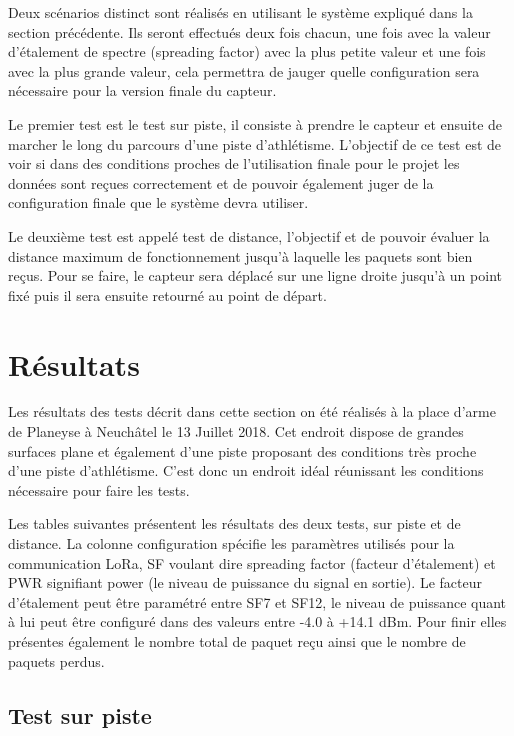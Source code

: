 Deux scénarios distinct sont réalisés en utilisant le système expliqué dans la section précédente. Ils seront effectués deux fois chacun, une fois avec la valeur d'étalement de spectre (spreading factor) avec la plus petite valeur et une fois avec la plus grande valeur, cela permettra de jauger quelle configuration sera nécessaire pour la version finale du capteur.

Le premier test est le test sur piste, il consiste à prendre le capteur et ensuite de marcher le long du parcours d'une piste d'athlétisme. L'objectif de ce test est de voir si dans des conditions proches de l'utilisation finale pour le projet les données sont reçues correctement et de pouvoir également juger de la configuration finale que le système devra utiliser.

Le deuxième test est appelé test de distance, l'objectif et de pouvoir évaluer la distance maximum de fonctionnement jusqu'à laquelle les paquets sont bien reçus. Pour se faire, le capteur sera déplacé sur une ligne droite jusqu'à un point fixé puis il sera ensuite retourné au point de départ.

\section{Résultats}

Les résultats des tests décrit dans cette section on été réalisés à la place d'arme de Planeyse à Neuchâtel le 13 Juillet 2018. Cet endroit dispose de grandes surfaces plane et également d'une piste proposant des conditions très proche d'une piste d'athlétisme. C'est donc un endroit idéal réunissant les conditions nécessaire pour faire les tests.

Les  tables suivantes présentent les résultats des deux tests, sur piste et de distance. La colonne configuration spécifie les paramètres utilisés pour la communication LoRa, SF voulant dire spreading factor (facteur d'étalement) et PWR signifiant power (le niveau de puissance du signal en sortie).  Le facteur d'étalement peut être paramétré entre SF7 et SF12, le niveau de puissance quant à lui peut être configuré dans des valeurs entre -4.0 à +14.1 dBm.
Pour finir elles présentes également le nombre total de paquet reçu ainsi que le nombre de paquets perdus.

\subsection{Test sur piste}

